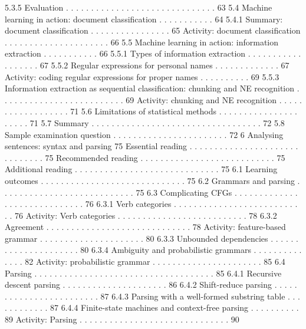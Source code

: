 5.3.5 Evaluation . . . . . . . . . . . . . . . . . . . . . . . . . . . . . . 63
5.4 Machine learning in action: document classification . . . . . . . . . . . 64
5.4.1 Summary: document classification . . . . . . . . . . . . . . . . 65
Activity: document classification . . . . . . . . . . . . . . . . . . . . . 66
5.5 Machine learning in action: information extraction . . . . . . . . . . . 66
5.5.1 Types of information extraction . . . . . . . . . . . . . . . . . . 67
5.5.2 Regular expressions for personal names . . . . . . . . . . . . . 67
Activity: coding regular expressions for proper names . . . . . . . . . . 69
5.5.3 Information extraction as sequential classification: chunking
and NE recognition . . . . . . . . . . . . . . . . . . . . . . . . . 69
Activity: chunking and NE recognition . . . . . . . . . . . . . . . . . . 71
5.6 Limitations of statistical methods . . . . . . . . . . . . . . . . . . . . . 71
5.7 Summary . . . . . . . . . . . . . . . . . . . . . . . . . . . . . . . . . . 72
5.8 Sample examination question . . . . . . . . . . . . . . . . . . . . . . . 72
6 Analysing sentences: syntax and parsing 75
Essential reading . . . . . . . . . . . . . . . . . . . . . . . . . . . . . . 75
Recommended reading . . . . . . . . . . . . . . . . . . . . . . . . . . . 75
Additional reading . . . . . . . . . . . . . . . . . . . . . . . . . . . . . 75
6.1 Learning outcomes . . . . . . . . . . . . . . . . . . . . . . . . . . . . . 75
6.2 Grammars and parsing . . . . . . . . . . . . . . . . . . . . . . . . . . . 75
6.3 Complicating CFGs . . . . . . . . . . . . . . . . . . . . . . . . . . . . . 76
6.3.1 Verb categories . . . . . . . . . . . . . . . . . . . . . . . . . . . 76
Activity: Verb categories . . . . . . . . . . . . . . . . . . . . . . . . . . 78
6.3.2 Agreement . . . . . . . . . . . . . . . . . . . . . . . . . . . . . 78
Activity: feature-based grammar . . . . . . . . . . . . . . . . . . . . . 80
6.3.3 Unbounded dependencies . . . . . . . . . . . . . . . . . . . . . 80
6.3.4 Ambiguity and probabilistic grammars . . . . . . . . . . . . . . 82
Activity: probabilistic grammar . . . . . . . . . . . . . . . . . . . . . . 85
6.4 Parsing . . . . . . . . . . . . . . . . . . . . . . . . . . . . . . . . . . . . 85
6.4.1 Recursive descent parsing . . . . . . . . . . . . . . . . . . . . . 86
6.4.2 Shift-reduce parsing . . . . . . . . . . . . . . . . . . . . . . . . 87
6.4.3 Parsing with a well-formed substring table . . . . . . . . . . . . 87
6.4.4 Finite-state machines and context-free parsing . . . . . . . . . . 89
Activity: Parsing . . . . . . . . . . . . . . . . . . . . . . . . . . . . . . 90
